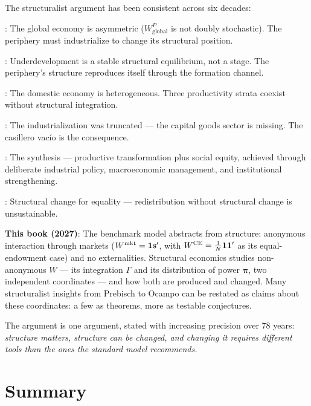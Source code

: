 \documentclass[../structural_economics_book.tex]{subfiles}
\begin{document}
\begin{prebisch}
The structuralist argument has been consistent across six decades:

\textbf{\citet{prebisch1949desarrollo}}: The global economy is asymmetric ($W^P_{\text{global}}$ is not doubly stochastic). The periphery must industrialize to change its structural position.

\textbf{\citet{furtado1961desenvolvimento}}: Underdevelopment is a stable structural equilibrium, not a stage. The periphery's structure reproduces itself through the formation channel.

\textbf{\citet{pinto1970naturaleza}}: The domestic economy is heterogeneous. Three productivity strata coexist without structural integration.

\textbf{\citet{fajnzylber1983industrializacion,fajnzylber1990industrializacion}}: The industrialization was truncated --- the capital goods sector is missing. The casillero vac\'{i}o is the consequence.

\textbf{\citet{ocampo2009growth}}: The synthesis --- productive transformation plus social equity, achieved through deliberate industrial policy, macroeconomic management, and institutional strengthening.

\textbf{\citet{cepal2012structural}}: Structural change for equality --- redistribution without structural change is unsustainable.

\textbf{This book (2027)}: The benchmark model abstracts from structure: anonymous interaction through markets ($W^{\text{mkt}} = \mathbf{1}\mathbf{s}'$, with $W^{\text{CE}} = \frac{1}{N}\mathbf{1}\mathbf{1}'$ as its equal-endowment case) and no externalities. Structural economics studies non-anonymous $W$ --- its integration $\Gamma$ and its distribution of power $\boldsymbol{\pi}$, two independent coordinates --- and how both are produced and changed. Many structuralist insights from Prebisch to Ocampo can be restated as claims about these coordinates: a few as theorems, more as testable conjectures.

The argument is one argument, stated with increasing precision over 78 years: \textit{structure matters, structure can be changed, and changing it requires different tools than the ones the standard model recommends.}
\end{prebisch}


\section{Summary}
\label{ch26:sec:summary}
\end{document}
